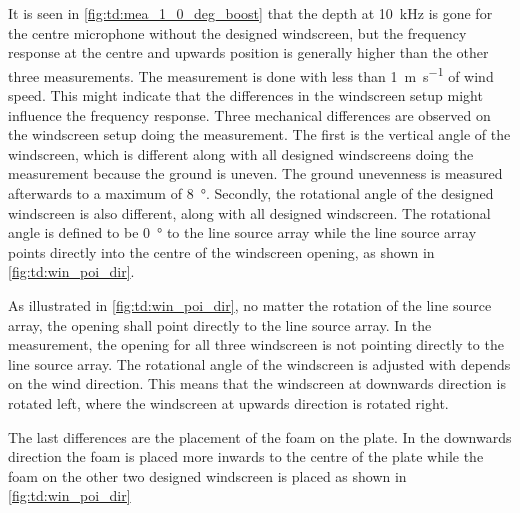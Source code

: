 
It is seen in \autoref{fig:td:mea_1_0_deg_boost} that the depth at \SI{10}{\kilo\hertz} is gone for the centre microphone without the designed windscreen, but the frequency response at the centre and upwards position is generally higher than the other three measurements. The measurement is done with less than \SI{1}{\meter\per\second} of wind speed. This might indicate that the differences in the windscreen setup might influence the frequency response. 
Three mechanical differences are observed on the windscreen setup doing the measurement. The first is the vertical angle of the windscreen, which is different along with all designed windscreens doing the measurement because the ground is uneven. The ground unevenness is measured afterwards to a maximum of \SI{8}{\degree}. Secondly, the rotational angle of the designed windscreen is also different, along with all designed windscreen. The rotational angle is defined to be \SI{0}{\degree} to the line source array while the line source array points directly into the centre of the windscreen opening, as shown in \autoref{fig:td:win_poi_dir}.


As illustrated in \autoref{fig:td:win_poi_dir}, no matter the rotation of the line source array, the opening shall point directly to the line source array. In the measurement, the opening for all three windscreen is not pointing directly to the line source array. The rotational angle of the windscreen is adjusted with depends on the wind direction. This means that the windscreen at downwards direction is rotated left, where the windscreen at upwards direction is rotated right. 

The last differences are the placement of the foam on the plate. In the downwards direction the foam is placed more inwards to the centre of the plate while the foam on the other two designed windscreen is placed as shown in \autoref{fig:td:win_poi_dir}



